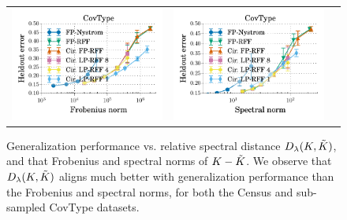 \begin{figure}
\begin{tabular}{@{\hskip -0.25in}c@{\hskip -0.25in}c@{\hskip -0.25in}c@{\hskip -0.25in}}
		\includegraphics[width=0.33\linewidth]{figures/classification_acc_vs_f_norm_all_line.pdf} &
		\includegraphics[width=0.33\linewidth]{figures/classification_acc_vs_s_norm_all_line.pdf} \\
	\end{tabular}
	\caption{Generalization performance vs. relative spectral distance $D_{\lambda}(K,\tilde{K})$, and that Frobenius and spectral norms of $K - \tilde{K}$. We observe that $D_{\lambda}(K,\tilde{K})$ aligns much better with generalization performance than the Frobenius and spectral norms, for both the Census and sub-sampled CovType datasets.}

\end{figure}
